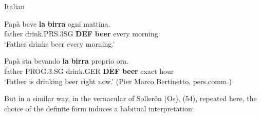 
\item 

\label{bkm:Ref173317986}Italian



\item 


 \ea\label{}
\gll Papà  beve  \textbf{la} \textbf{birra} ogni  mattina.\\


father  drink.PRS.3SG  \textbf{DEF} \textbf{beer} every  morning\\

\glt ‘Father drinks beer every morning.’ 

\z

\item 


 \ea\label{} \gll Papà  sta  bevando  \textbf{la} \textbf{birra} proprio  ora.\\


father  PROG.3.SG  drink.GER  \textbf{DEF} \textbf{beer} exact  hour\\

\glt ‘Father is drinking beer right now.’ (Pier Marco Bertinetto, pers.comm.)

\z

But in a similar way, in the vernacular of Sollerön (Os), (54), repeated here, the choice of the definite form induces a habitual interpretation:


\ea%
    \label{ex:54}
    \\
    \gll\\
	\\
    \glt     \z

